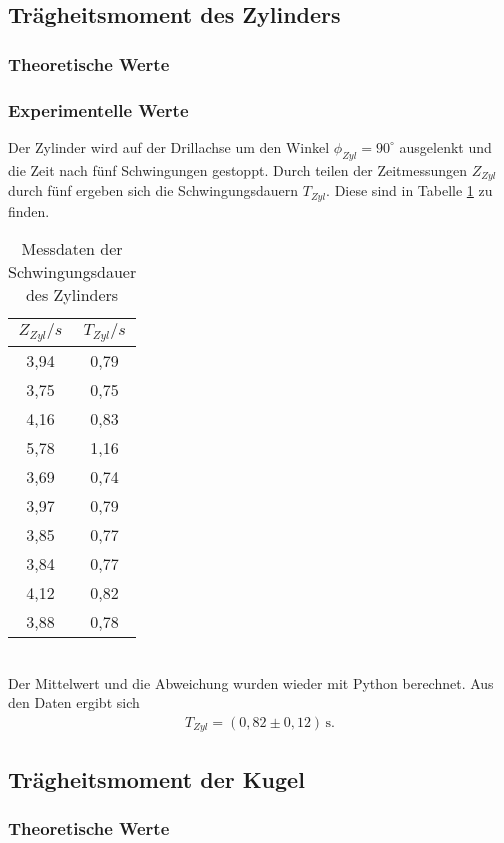\subsection{Trägheitsmoment des Zylinders}
\subsubsection{Theoretische Werte}

\subsubsection{Experimentelle Werte}
Der Zylinder wird auf der Drillachse um den Winkel $\phi_{Zyl} = 90^{\circ}$ ausgelenkt und die Zeit
nach fünf Schwingungen gestoppt.
Durch teilen der Zeitmessungen $Z_{Zyl}$ durch fünf ergeben sich die Schwingungsdauern $T_{Zyl}$. 
Diese sind in Tabelle \ref{tab:T_Zyl} zu finden.
\begin{table}
  \centering
  \caption{Messdaten der Schwingungsdauer des Zylinders}
  \label{tab:T_Zyl}
  \begin{tabular}{c c}
    \toprule
    $Z_{Zyl}/s$ & $T_{Zyl}/s$ \\
    \midrule
    3,94 & 0,79 \\
    3,75 & 0,75 \\
    4,16 & 0,83 \\
    5,78 & 1,16 \\
    3,69 & 0,74 \\
    3,97 & 0,79 \\
    3,85 & 0,77 \\
    3,84 & 0,77 \\
    4,12 & 0,82 \\
    3,88 & 0,78 \\
    \bottomrule
  \end{tabular}
\end{table}
\\
Der Mittelwert und die Abweichung wurden wieder mit Python berechnet.
Aus den Daten ergibt sich
\begin{align*}
  T_{Zyl} = (0{,}82 \pm 0{,}12)\, \mathrm{s} .
\end{align*}

\subsection{Trägheitsmoment der Kugel}
\subsubsection{Theoretische Werte}

